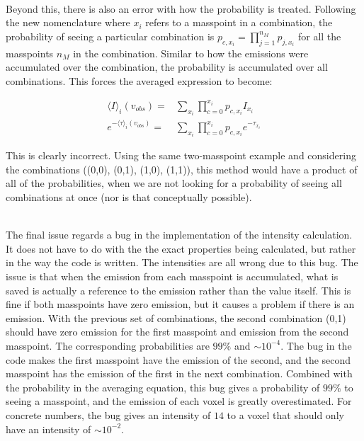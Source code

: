\documentclass[onecolumn]{article}
\begin{document}
  \hfill \\
  
  Beyond this, there is also an error with how the probability is treated. Following the new nomenclature where $x_i$ refers to a masspoint in a combination, the probability of seeing a particular combination is $p_{c,x_i} = \prod_{j=1}^{n_M} p_{j,x_i}$ for all the masspoints $n_M$ in the combination. Similar to how the emissions were accumulated over the combination, the probability is accumulated over all combinations. This forces the averaged expression to become:
  
  \begin{align*}
    \langle I \rangle_i(v_{obs}) =& \sum_{x_i} \prod_{c=0}^{x_i} p_{c,x_i} I_{x_i} \\
    e^{-\langle \tau \rangle_i(v_{obs})} =& \sum_{x_i} \prod_{c=0}^{x_i} p_{c,x_i} e^{-\tau_{x_i}}
  \end{align*}
  
  This is clearly incorrect. Using the same two-masspoint example and considering the combinations ((0,0), (0,1), (1,0), (1,1)), this method would have a product of all of the probabilities, when we are not looking for a probability of seeing all combinations at once (nor is that conceptually possible).
  
  \hfill \\
  
  The final issue regards a bug in the implementation of the intensity calculation. It does not have to do with the the exact properties being calculated, but rather in the way the code is written. The intensities are all wrong due to this bug. The issue is that when the emission from each masspoint is accumulated, what is saved is actually a reference to the emission rather than the value itself. This is fine if both masspoints have zero emission, but it causes a problem if there is an emission. With the previous set of combinations, the second combination (0,1) should have zero emission for the first masspoint and emission from the second masspoint. The corresponding probabilities are $99\%$ and $\sim10^{-4}$. The bug in the code makes the first masspoint have the emission of the second, and the second masspoint has the emission of the first in the next combination. Combined with the probability in the averaging equation, this bug gives a probability of $99\%$ to seeing a masspoint, and the emission of each voxel is greatly overestimated. For concrete numbers, the bug gives an intensity of $14$ to a voxel that should only have an intensity of $\sim 10^{-2}$.
  
\end{document}
